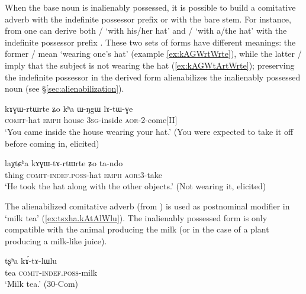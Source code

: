 When the base noun is inalienably possessed, it is possible to build a comitative adverb with the indefinite possessor prefix or with the bare stem. For instance, from  one can derive both  /  `with his/her hat' and  /  `with a/the hat' with the indefinite possessor prefix . These two sets of forms have different meanings: the former  /  mean `wearing one's hat' (example \ref{ex:kAGWrtWrte}), while the latter  /  imply that the subject is not wearing the hat (\ref{ex:kAGWtArtWrte}); preserving the indefinite possessor in the derived form alienabilizes the inalienably possessed noun (see §\ref{sec:alienabilization}).

\begin{exe}
\ex \label{ex:kAGWrtWrte}
\gll kɤɣɯ-rtɯ\tld{}rte ʑo kʰa ɯ-ŋgɯ lɤ-tɯ-ɣe \\
\textsc{comit}-hat \textsc{emph} house \textsc{3sg}-inside \textsc{aor}-2-come[II] \\
\glt `You came inside the house wearing your hat.' (You were expected to take it off before coming in, elicited)
\end{exe}

\begin{exe}
\ex \label{ex:kAGWtArtWrte}
\gll laχtɕʰa kɤɣɯ-tɤ-rtɯ\redp{}rte ʑo ta-ndo \\
thing \textsc{comit}-\textsc{indef}.\textsc{poss}-hat \textsc{emph} \textsc{aor}:3\flobv{}-take \\
\glt `He took the hat along with the other objects.' (Not wearing it, elicited)
\end{exe}

The alienabilized comitative adverb  (from ) is used as postnominal modifier in `milk tea' (\ref{ex:tsxha.kAtAlWlu}). The inalienably possessed form  is only compatible with the animal producing the milk (or in the case of a plant producing a milk-like juice).

\begin{exe}
\ex \label{ex:tsxha.kAtAlWlu}
\gll  tʂʰa kɤ́-tɤ-lɯ\redp{}lu \\
 tea \textsc{comit}-\textsc{indef}.\textsc{poss}-milk \\
\glt `Milk tea.' (30-Com) 
\end{exe}

